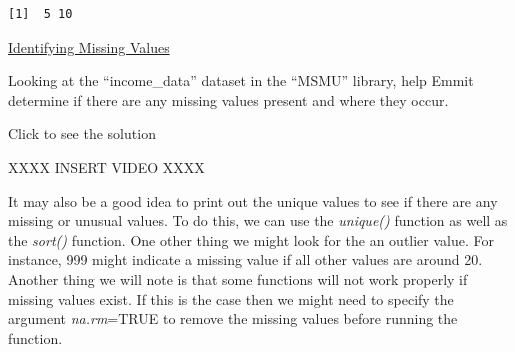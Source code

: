 \documentclass[
  letterpaper,
  DIV=11,
  numbers=noendperiod]{scrreprt}
\newenvironment{Shaded}{\begin{snugshade}}{\end{snugshade}}
\newcommand{\AttributeTok}[1]{\textcolor[rgb]{0.40,0.45,0.13}{#1}}
\newcommand{\ConstantTok}[1]{\textcolor[rgb]{0.56,0.35,0.01}{#1}}
\newcommand{\DecValTok}[1]{\textcolor[rgb]{0.68,0.00,0.00}{#1}}
\newcommand{\FunctionTok}[1]{\textcolor[rgb]{0.28,0.35,0.67}{#1}}
\newcommand{\NormalTok}[1]{\textcolor[rgb]{0.00,0.23,0.31}{#1}}
\newcommand{\SpecialCharTok}[1]{\textcolor[rgb]{0.37,0.37,0.37}{#1}}
\begin{document}
\begin{Shaded}
\end{Shaded}

\begin{verbatim}
[1]  5 10
\end{verbatim}

\begin{watch}{}{}
    \href{https://youtu.be/Gj_-ZS9wH6c}{Identifying Missing Values}
\end{watch}

\begin{tcolorbox}[enhanced jigsaw, colbacktitle=quarto-callout-tip-color!10!white, breakable, bottomrule=.15mm, colframe=quarto-callout-tip-color-frame, left=2mm, opacitybacktitle=0.6, title=\textcolor{quarto-callout-tip-color}{\faLightbulb}\hspace{0.5em}{Try it Out}, leftrule=.75mm, opacityback=0, rightrule=.15mm, titlerule=0mm, bottomtitle=1mm, colback=white, toprule=.15mm, arc=.35mm, toptitle=1mm, coltitle=black]

Looking at the ``income\_data'' dataset in the ``MSMU'' library, help
Emmit determine if there are any missing values present and where they
occur.

Click to see the solution

XXXX INSERT VIDEO XXXX

\end{tcolorbox}

It may also be a good idea to print out the unique values to see if
there are any missing or unusual values. To do this, we can use the
\emph{unique()} function as well as the \emph{sort()} function. One
other thing we might look for the an outlier value. For instance, 999
might indicate a missing value if all other values are around 20.
Another thing we will note is that some functions will not work properly
if missing values exist. If this is the case then we might need to
specify the argument \emph{na.rm}=TRUE to remove the missing values
before running the function.

\begin{Shaded}
\end{Shaded}
\end{document}
